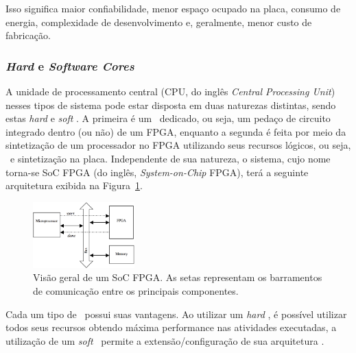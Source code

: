       Isso significa maior confiabilidade, menor espaço ocupado na placa, consumo de energia, complexidade de desenvolvimento e, geralmente, menor custo de fabricação.

      \subsubsection{\textit{Hard} e \textit{Software Cores}}
         A unidade de processamento central (CPU, do inglês \textit{Central Processing Unit}) nesses tipos de sistema pode estar disposta em duas naturezas distintas, sendo estas \textit{hard} e \textit{soft} \cores.
         A primeira é um \core\ dedicado, ou seja, um pedaço de circuito integrado dentro (ou não) de um FPGA, enquanto a segunda é feita por meio da sintetização de um processador no FPGA utilizando seus recursos lógicos, ou seja, \design\ e sintetização na placa.
         Independente de sua natureza, o sistema, cujo nome torna-se SoC FPGA (do inglês, \textit{System-on-Chip} FPGA), terá a seguinte arquitetura exibida na Figura~\ref{fig:rb-soc}.
         
         \begin{figure}[h] 
            \centering
            \vspace{-1em}
            \includegraphics[width=0.35\textwidth]{img/into-soc.png}
            \caption{Visão geral de um SoC FPGA. As setas representam os barramentos de comunicação entre os principais componentes.}
            \label{fig:rb-soc}
         \end{figure}
         
         Cada um tipo de \core\ possui suas vantagens.
         Ao utilizar um \textit{hard} \core, é possível utilizar todos seus recursos obtendo máxima performance nas atividades executadas, a utilização de um \textit{soft} \core\ permite a extensão/configuração de sua arquitetura \cite{Plessl2003}.


